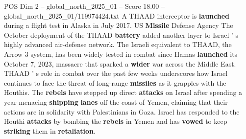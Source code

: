 \begin{textsample}{POS Dim 2 – global\_north\_2025\_01 – Score 18.00 – global\_north\_2025\_01/119974424.txt}
A THAAD interceptor is \textbf{launched} during a flight test in Alaska in July 2017.
US \textbf{Missile} Defense Agency The October deployment of the THAAD \textbf{battery} added another layer to Israel ' s highly advanced air-defense network.
The Israeli equivalent to THAAD, the Arrow 3 system, has been widely tested in combat since Hamas \textbf{launched} its October 7, 2023, massacre that sparked a \textbf{wider} war across the Middle East.
THAAD ' s role in combat over the past few weeks underscores how Israel continues to face the threat of long-range \textbf{missiles} as it grapples with the Houthis.
The \textbf{rebels} have stepped up direct \textbf{attacks} on Israel after spending a year menacing \textbf{shipping} \textbf{lanes} off the coast of Yemen, claiming that their actions are in solidarity with Palestinians in Gaza.
Israel has responded to the Houthi \textbf{attacks} by bombing the \textbf{rebels} in Yemen and has \textbf{vowed} to keep \textbf{striking} them in \textbf{retaliation}.

\end{textsample}
